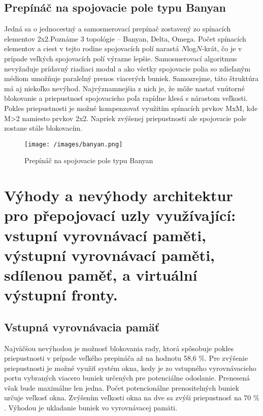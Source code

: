 \newpage
\subsection{Prepínáč na spojovacie pole typu Banyan}
Jedná sa o jednocestný a samosmerovací prepínač zostavený zo spínacích elementov 2x2.Poznáme 3 topológie -- Banyan, Delta, Omega.\newline
Počet spínacích elementov a ciest v tejto rodine spojovacích polí narastá $N$log$N$-krát, čo je v prípade veľkých spojovacích polí výrazne lepšie. Samosmerovací algoritmus nevyžaduje prídavný riadiaci modul a ako všetky spojovacie polia so zdieľaným médiom umožňuje paralelný prenos viacerých buniek. Samozrejme, táto štruktúra má aj niekoľko nevýhod. Najvýznamnejšia z nich je, že môže nastať vnútorné blokovanie a priepustnosť spojovacieho poľa rapídne klesá s nárastom veľkosti. Pokles priepustnosti je možné kompenzovať využitím spínacích prvkov MxM, kde M>2 namiesto prvkov 2x2. Napriek zvýšenej priepustnosti ale spojovacie pole zostane stále blokovacím.

\begin{figure}[ht]
\centering
  \begin{center}
    \texttt{[image: /images/banyan.png]}
  \end{center}
  \caption[Prepínáč na spojovacie pole typu Banyan]{Prepínáč na spojovacie pole typu Banyan}
\end{figure}

\newpage
\section{Výhody a nevýhody architektur pro přepojovací uzly využívající: vstupní vyrovnávací paměti, výstupní vyrovnávací paměti, sdílenou paměť, a virtuální výstupní fronty.}

\subsection{Vstupná vyrovnávacia pamäť}
Najväčšou nevýhodou je možnosť blokovania rady, ktorá spôsobuje pokles priepustnosti v prípade veľkého prepináča až na hodnotu 58,6 $\%$. Pre zvýšenie priepustnosti je možné využiť systém okna, kedy je zo vstupného vyrovnávacieho portu vybraných viacero buniek určených pre potenciálne odoslanie. Prenesená však bude maximálne len jedna. Počet potencionálne prenositelných buniek určuje veľkosť okna. Zvýšením veľkosti okna na dve sa zvýši priepustnosť na 70 $\%$. Výhodou je ukladanie buniek vo vyrovnávacej pamäti.

